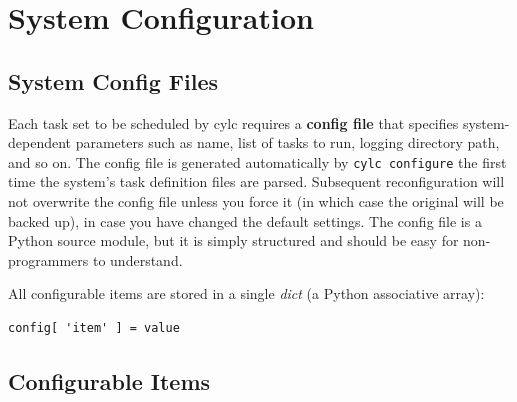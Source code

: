 \documentclass[11pt,a4paper]{article}
\begin{document}
\section{System Configuration}
\label{SystemConfiguration}

\subsection{System Config Files}
\label{SystemConfigFiles}

Each task set to be scheduled by cylc requires a {\bf config file} that
specifies system-dependent parameters such as name, list of tasks to
run, logging directory path, and so on. The config file is generated
automatically by \lstinline=cylc configure= the first time the system's
task definition files are parsed. Subsequent reconfiguration will not
overwrite the config file unless you force it (in which case the
original will be backed up), in case you have changed the default
settings. The config file is a Python source module, but it is simply
structured and should be easy for non-programmers to understand. 

All configurable items are stored in a single {\em dict} (a Python
associative array):

\lstset{language=Python}
\begin{lstlisting}
config[ 'item' ] = value
\end{lstlisting}

\subsection{Configurable Items}
\label{ConfigurableItems}
\end{document}
